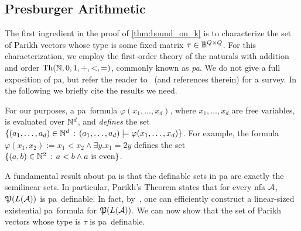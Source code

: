 \subsection*{Presburger Arithmetic}
The first ingredient in the proof of \autoref{thm:bound_on_k} is to characterize the set of Parikh vectors whose type is some fixed matrix $\tau\in \mathbb{B}^{Q\times Q}$. For this characterization, we employ the first-order theory of the naturals with addition and order $\textrm{Th}(\mathbb{N},0,1,+,<,=)$, commonly known as \emph{\gls{pa}}. We do not give a full exposition of \gls{pa}, but refer the reader to~\cite{Haase2018} (and references therein) for a survey. In the following we briefly cite the results we need.

For our purposes, a \gls{pa}~formula $\varphi(x_1,\ldots,x_d)$, where $x_1,\ldots, x_d$ are free variables, is evaluated over $\mathbb{N}^d$, and \emph{defines} the set $\{(a_1,\ldots,a_d)\in \mathbb{N}^d\, :\, (a_1,\ldots,a_d)\models \varphi(x_1,\ldots,x_d)\}$. For example, the formula $\varphi(x_1,x_2):=x_1< x_2\wedge \exists y. x_1=2y$ defines the set $\{(a,b)\in \mathbb{N}^2\, :\, a<b\wedge a \text{ is even}\}$.

A fundamental result about \gls{pa} is that the definable sets in \gls{pa} are exactly the semilinear sets. In particular, Parikh's Theorem states that for every \gls{nfa} $\mathcal{A}$, $\mathfrak{P}(L(\mathcal{A}))$ is \gls{pa}~definable. In fact, by~\cite{Verma2005}, one can efficiently construct a linear-sized existential \gls{pa}~formula for $\mathfrak{P}(L(\mathcal{A}))$.
We can now show that the set of Parikh vectors whose type is $\tau$ is \gls{pa}~definable.


